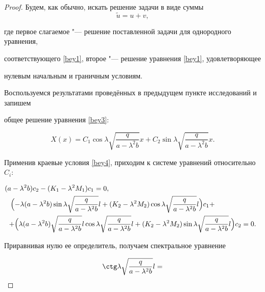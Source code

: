 \begin{proof} Будем, как обычно, искать решение задачи в виде суммы $$\tilde u=u+v,$$

где первое слагаемое "--- решение поставленной задачи для однородного уравнения,

соответствующего \eqref{bey1}, второе "--- решение уравнения \eqref{bey1}, удовлетворяющее

нулевым начальным и граничным условиям.

Воспользуемся результатами проведённых в предыдущем пункте исследований и запишем

общее решение уравнения \eqref{bey3}:

\begin{equation}

\label{bey8}

X(x)=C_1\cos \lambda \sqrt{\frac{q}{a-\lambda^2b}}x+

C_2\sin \lambda \sqrt{\frac{q}{a-\lambda^2b}}x.

\end{equation}

Применив краевые условия \eqref{bey4}, приходим к системе уравнений относительно~$C_i$:

\begin{gather*}

(a-\lambda^2b)c_2-(K_1-\lambda^2M_1)c_1=0, \hspace{7.6cm}

\\

\Bigl(-\lambda(a-\lambda^2b)\sin \lambda\sqrt{\frac{q}{a-\lambda^2b}}l+

(K_2-\lambda^2M_2)\cos \lambda\sqrt{\frac{q}{a-\lambda^2b}}l\Bigr)c_1+ \hspace{2cm}

\\

+\Bigl(\lambda (a-\lambda^2b)\sqrt{\frac{q}{a-\lambda^2b}}l

\cos\lambda\sqrt{\frac{q}{a-\lambda^2b}}l+

(K_2-\lambda^2M_2)\sin \lambda\sqrt{\frac{q}{a-\lambda^2b}}l\Bigr)c_2=0.

\end{gather*}

Приравнивая нулю ее определитель, получаем спектральное уравнение

\begin{equation}

\label{bey9}

\ctg \lambda \sqrt{\frac{q}{a-\lambda^2b}}l=


\end{equation}
\end{proof}
